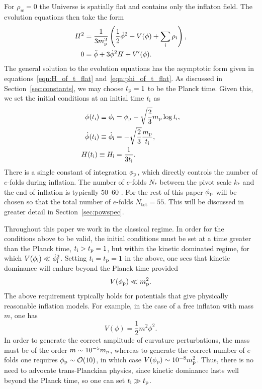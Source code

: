 For $\rho_w=0$ the Universe is spatially flat and contains only the inflaton field. The evolution equations then take the form
%
\begin{align}
  H^2 
  &= 
  \frac{1}{3m_{\mathrm{p}}^2}
  \left(\frac{1}{2}\dot{\phi}^2 + V(\phi) + \sum_i\rho_i\right),
  \label{eqn:Friedmann_eq} 
  \\
  0
  &= 
  \ddot{\phi} +3\dot{\phi}^2H + V^\prime(\phi).
  \label{eqn:Motion_eq_Scalar}
\end{align}
%
The general solution to the evolution equations has the asymptotic form given in equations~\eqref{eqn:H_of_t_flat} and~\eqref{eqn:phi_of_t_flat}. As discussed in Section~\ref{sec:constants}, we may choose $t_{\mathrm{p}}=1$ to be the Planck time. Given this, we set the initial conditions at an initial time $t_{\mathrm{i}}$ as
%
\begin{align}
  \phi(t_{\mathrm{i}}) \equiv \phi_{\mathrm{i}}
  &= 
  \phi_{\mathrm{p}} - \sqrt{\frac{2}{3}}m_{\mathrm{p}}\log t_{\mathrm{i}}, 
  \label{eqn:phi_ic}
  \\
  \dot\phi(t_{\mathrm{i}}) 
  \equiv 
  \dot\phi_{\mathrm{i}}
  &= 
  -\sqrt{\frac{2}{3}}\frac{m_{\mathrm{p}}}{t_{\mathrm{i}}}, 
  \label{eqn:phid_ic}
  \\
  H(t_{\mathrm{i}}) 
  \equiv 
  H_{\mathrm{i}}
  &= 
  \frac{1}{3t_{\mathrm{i}}}. 
  \label{eqn:H_ic}
\end{align}
There is a single constant of integration $\phi_{\mathrm{p}}$, which directly controls the number of $e$-folds during inflation. The number of $e$-folds $N_*$ between the pivot scale $k_*$ and the end of inflation is typically $50$--$60$ \citep{planck_collaboration_planck_2013-1}. For the rest of this paper $\phi_{\mathrm{p}}$ will be chosen so that the total number of $e$-folds $N_\mathrm{tot}=55$. This will be discussed in greater detail in Section~\ref{sec:powspec}.

Throughout this paper we work in the classical regime. In order for the conditions above to be valid, the initial conditions must be set at a time greater than the Planck time, $t_{\mathrm{i}} >t_{\mathrm{p}}=1$, but within the kinetic dominated regime, for which $V(\phi_{\mathrm{i}}) \ll \dot\phi_{\mathrm{i}}^2$. Setting $t_{\mathrm{i}}=t_{\mathrm{p}}=1$ in the above, one sees that kinetic dominance will endure beyond the Planck time provided
%
\begin{equation}
  V(\phi_{\mathrm{p}}) \ll m_{\mathrm{p}}^2.
\end{equation}
%
The above requirement typically holds for potentials that give physically reasonable inflation models. For example, in the case of a free inflaton with mass $m$, one has \[ V(\phi) = \frac{1}{2}m^2 \phi^2.\] In order to generate the correct amplitude of curvature perturbations, the mass must be of the order $m\sim10^{-5}m_{\mathrm{p}}$, whereas to generate the correct number of $e$-folds one requires $\phi_{\mathrm{p}}\sim\mathcal{O}(10)$, in which case $V(\phi_{\mathrm{p}}) \sim 10^{-8} m_{\mathrm{p}}^2$.  Thus, there is no need to advocate trans-Planckian physics, since kinetic dominance lasts well beyond the Planck time, so one can set $t_{\mathrm{i}} \gg t_{\mathrm{p}}$.


